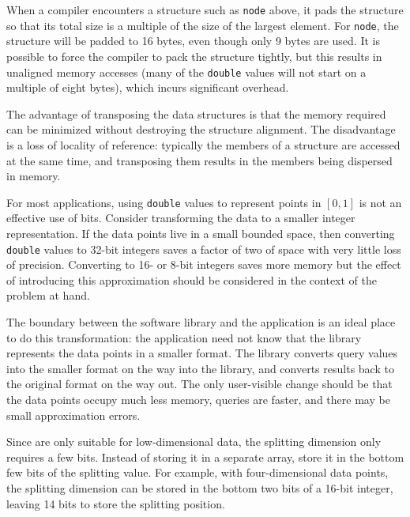 When a compiler encounters a structure such as {\tt node} above,
it pads the structure so that its total size is a multiple of the size of
the largest element.  For {\tt node}, the structure will be padded to 16
bytes, even though only 9 bytes are used.  It is possible to force the
compiler to pack the structure tightly, but this results in unaligned memory
accesses (many of the {\tt double} values will not start on a multiple of eight
bytes), which incurs significant overhead.


The advantage of transposing the data structures is that the memory required
can be minimized without destroying the structure alignment.  The disadvantage
is a loss of locality of reference: typically the members of a structure are
accessed at the same time, and transposing them results in the members being
dispersed in memory.

\label{trick:smalltypes}
For most applications, using {\tt double} values to represent points
in $\left[0,1\right]$ is not an effective use of bits.  Consider
transforming the data to a smaller integer representation.  If the
data points live in a small bounded space, then converting {\tt
double} values to 32-bit integers saves a factor of two of space with
very little loss of precision.  Converting to 16- or 8-bit integers
saves more memory but the effect of introducing this approximation
should be considered in the context of the problem at hand.


The boundary between the \kdtree software library and the application
is an ideal place to do this transformation: the application need not
know that the \kdtree library represents the data points in a smaller
format.  The \kdtree library converts query values into the smaller
format on the way into the library, and converts results back to the
original format on the way out.  The only user-visible change should
be that the data points occupy much less memory, queries are faster,
and there may be small approximation errors.


\label{trick:packbits}
Since \kdtrees are only suitable for low-dimensional data, the
splitting dimension only requires a few bits.  Instead of storing it
in a separate array, store it in the bottom few bits of the splitting
value.  For example, with four-dimensional data points, the splitting
dimension can be stored in the bottom two bits of a 16-bit integer,
leaving 14 bits to store the splitting position.


